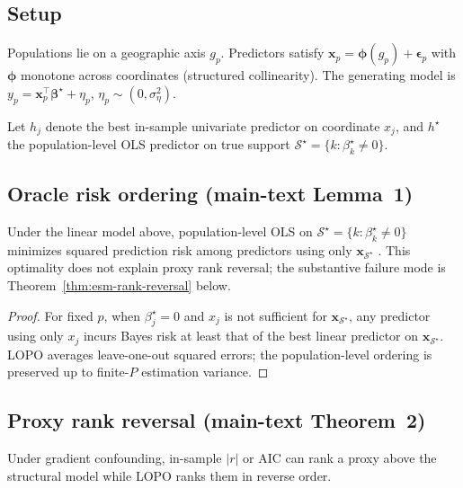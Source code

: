 \documentclass[11pt]{article}
\begin{document}
\subsection{Setup}

Populations lie on a geographic axis $g_p$.  Predictors satisfy
$\mathbf{x}_p = \boldsymbol{\phi}(g_p)+\boldsymbol{\epsilon}_p$ with
$\boldsymbol{\phi}$ monotone across coordinates (structured collinearity).
The generating model is
$y_p = \mathbf{x}_p^\top\boldsymbol{\beta}^\star + \eta_p$,
$\eta_p\sim(0,\sigma_\eta^2)$.

Let $h_j$ denote the best in-sample univariate predictor on coordinate $x_j$,
and $h^\star$ the population-level OLS predictor on true support
$\mathcal{S}^\star=\{k:\beta_k^\star\neq 0\}$.

\subsection{Oracle risk ordering (main-text Lemma~1)}
\label{sec:esm-lemma-oracle}

\begin{lemma}
\label{thm:esm-gradient}
Under the linear model above, population-level OLS on
$\mathcal{S}^\star=\{k:\beta_k^\star\neq 0\}$ minimizes squared prediction
risk among predictors using only $\mathbf{x}_{\mathcal{S}^\star}$
\citep{hastie2009}.  This optimality does not explain proxy rank reversal;
the substantive failure mode is Theorem~\ref{thm:esm-rank-reversal} below.
\end{lemma}

\begin{proof}
For fixed $p$, when $\beta_j^\star=0$ and $x_j$ is not sufficient for
$\mathbf{x}_{\mathcal{S}^\star}$, any predictor using only $x_j$ incurs
Bayes risk at least that of the best linear predictor on
$\mathbf{x}_{\mathcal{S}^\star}$.  LOPO averages leave-one-out squared
errors; the population-level ordering is preserved up to finite-$P$
estimation variance.
\end{proof}

\subsection{Proxy rank reversal (main-text Theorem~2)}
\label{sec:esm-rank-reversal}

\begin{theorem}
\label{thm:esm-rank-reversal}
Under gradient confounding, in-sample $|r|$ or AIC can rank a proxy above
the structural model while LOPO ranks them in reverse order.
\end{theorem}
\end{document}
